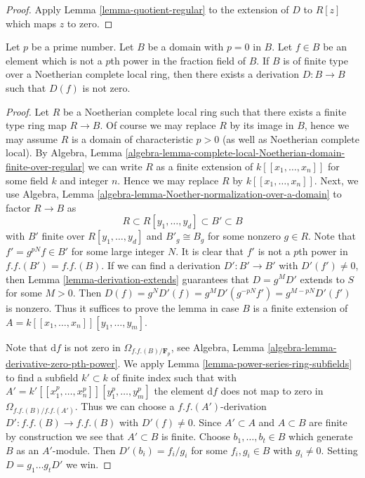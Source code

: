 \begin{proof}
Apply Lemma \ref{lemma-quotient-regular}
to the extension of $D$ to $R[z]$ which maps $z$ to zero.
\end{proof}

\begin{lemma}
\label{lemma-find-D}
Let $p$ be a prime number. Let $B$ be a domain with $p = 0$ in $B$.
Let $f \in B$ be an element which is not a $p$th power in the fraction
field of $B$. If $B$ is of finite type over a Noetherian complete
local ring, then there exists a derivation $D : B \to B$ such that $D(f)$
is not zero.
\end{lemma}

\begin{proof}
Let $R$ be a Noetherian complete local ring such that there exists
a finite type ring map $R \to B$. Of course we may replace $R$ by
its image in $B$, hence we may assume $R$ is a domain of characteristic
$p > 0$ (as well as Noetherian complete local). By Algebra, Lemma
\ref{algebra-lemma-complete-local-Noetherian-domain-finite-over-regular}
we can write $R$ as a finite extension of $k[[x_1, \ldots, x_n]]$ for some
field $k$ and integer $n$. Hence we may replace $R$ by $k[[x_1, \ldots, x_n]]$.
Next, we use
Algebra, Lemma \ref{algebra-lemma-Noether-normalization-over-a-domain}
to factor $R \to B$ as
$$
R \subset R[y_1, \ldots, y_d] \subset B' \subset B
$$
with $B'$ finite over $R[y_1, \ldots, y_d]$ and $B'_g \cong B_g$
for some nonzero $g \in R$. Note that $f' = g^{pN} f \in B'$ for some
large integer $N$. It is clear that $f'$ is not a $p$th power in
$f.f.(B') = f.f.(B)$. If we can find a derivation
$D' : B' \to B'$ with $D'(f') \not = 0$, then
Lemma \ref{lemma-derivation-extends}
guarantees that $D = g^MD'$ extends to $S$ for some $M > 0$. Then
$D(f) = g^ND'(f) = g^MD'(g^{-pN}f') = g^{M - pN}D'(f')$ is nonzero.
Thus it suffices to prove the lemma in case
$B$ is a finite extension of $A = k[[x_1, \ldots, x_n]][y_1, \ldots, y_m]$.

\medskip\noindent
Note that $\text{d}f$ is not zero in $\Omega_{f.f.(B)/\mathbf{F}_p}$, see
Algebra, Lemma \ref{algebra-lemma-derivative-zero-pth-power}.
We apply Lemma \ref{lemma-power-series-ring-subfields} to find a subfield
$k' \subset k$ of finite index such that with
$A' = k'[[x_1^p, \ldots, x_n^p]][y_1^p, \ldots, y_m^p]$ the element
$\text{d}f$ does not map to zero in $\Omega_{f.f.(B)/f.f.(A')}$.
Thus we can choose a $f.f.(A')$-derivation $D' : f.f.(B) \to f.f.(B)$
with $D'(f) \not = 0$. Since $A' \subset A$ and $A \subset B$ are
finite by construction we see that $A' \subset B$ is finite.
Choose $b_1, \ldots, b_t \in B$ which generate $B$ as an $A'$-module.
Then $D'(b_i) = f_i/g_i$ for some $f_i, g_i \in B$ with $g_i \not = 0$.
Setting $D = g_1 \ldots g_t D'$ we win.
\end{proof}

